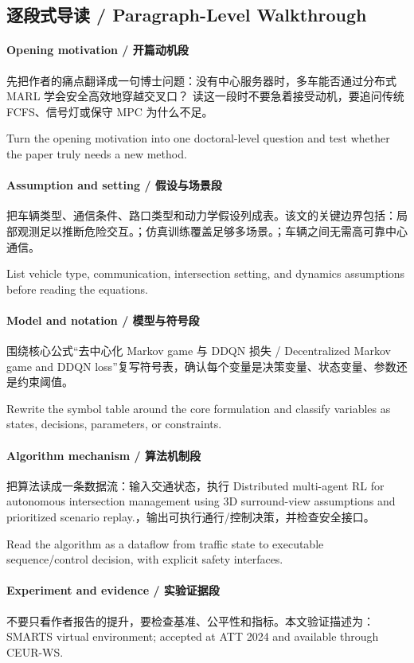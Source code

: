 \documentclass[UTF8,a4paper,11pt,fontset=fandol]{ctexart}
\begin{document}
\subsection{逐段式导读 / Paragraph-Level Walkthrough}
\paragraph{Opening motivation / 开篇动机段}先把作者的痛点翻译成一句博士问题：没有中心服务器时，多车能否通过分布式 MARL 学会安全高效地穿越交叉口？ 读这一段时不要急着接受动机，要追问传统 FCFS、信号灯或保守 MPC 为什么不足。

Turn the opening motivation into one doctoral-level question and test whether the paper truly needs a new method.

\paragraph{Assumption and setting / 假设与场景段}把车辆类型、通信条件、路口类型和动力学假设列成表。该文的关键边界包括：局部观测足以推断危险交互。；仿真训练覆盖足够多场景。；车辆之间无需高可靠中心通信。

List vehicle type, communication, intersection setting, and dynamics assumptions before reading the equations.

\paragraph{Model and notation / 模型与符号段}围绕核心公式“去中心化 Markov game 与 DDQN 损失 / Decentralized Markov game and DDQN loss”复写符号表，确认每个变量是决策变量、状态变量、参数还是约束阈值。

Rewrite the symbol table around the core formulation and classify variables as states, decisions, parameters, or constraints.

\paragraph{Algorithm mechanism / 算法机制段}把算法读成一条数据流：输入交通状态，执行 Distributed multi-agent RL for autonomous intersection management using 3D surround-view assumptions and prioritized scenario replay.，输出可执行通行/控制决策，并检查安全接口。

Read the algorithm as a dataflow from traffic state to executable sequence/control decision, with explicit safety interfaces.

\paragraph{Experiment and evidence / 实验证据段}不要只看作者报告的提升，要检查基准、公平性和指标。本文验证描述为：SMARTS virtual environment; accepted at ATT 2024 and available through CEUR-WS.
\end{document}
